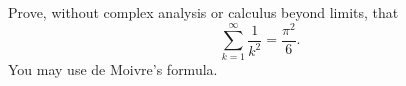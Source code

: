 Prove, without complex analysis or calculus beyond limits, that
\[\sum_{k=1}^{\infty}\dfrac1{k^2}=\dfrac{\pi^2}{6}.\]
You may use de Moivre's formula.
